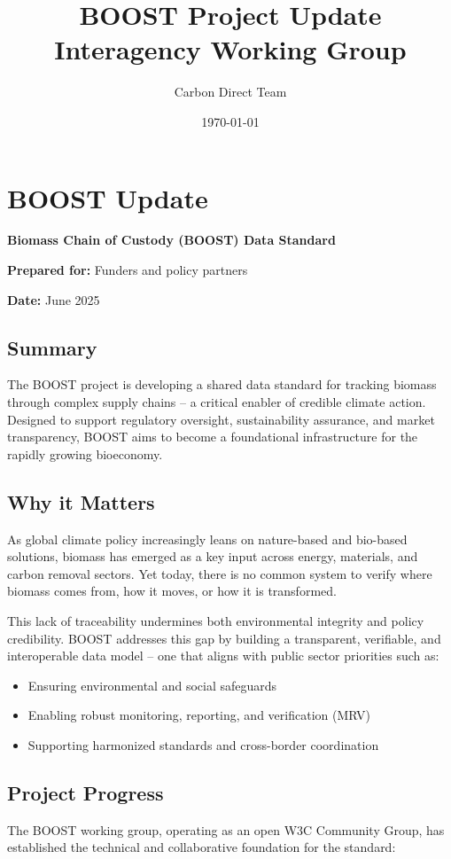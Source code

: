 \documentclass[title=small,preset=opensansnote,par=skip]{article}
\author{Carbon Direct Team}
\date{\today}
\title{BOOST Project Update\\\medskip
\large Interagency Working Group}
\begin{document}
\maketitle
\section{BOOST Update}
\label{boost-project-update}
\textbf{Biomass Chain of Custody (BOOST) Data Standard}

\textbf{Prepared for:} Funders and policy partners

\textbf{Date:} June 2025
\subsection{Summary}
\label{summary}
The BOOST project is developing a shared data standard for tracking biomass through complex supply chains -- a critical enabler of credible climate action. Designed to support regulatory oversight, sustainability assurance, and market transparency, BOOST aims to become a foundational infrastructure for the rapidly growing bioeconomy.
\subsection{Why it Matters}
\label{why-it-matters}
As global climate policy increasingly leans on nature-based and bio-based solutions, biomass has emerged as a key input across energy, materials, and carbon removal sectors. Yet today, there is no common system to verify where biomass comes from, how it moves, or how it is transformed.

This lack of traceability undermines both environmental integrity and policy credibility. BOOST addresses this gap by building a transparent, verifiable, and interoperable data model -- one that aligns with public sector priorities such as:

\begin{itemize}
\item Ensuring environmental and social safeguards

\item Enabling robust monitoring, reporting, and verification (MRV)

\item Supporting harmonized standards and cross-border coordination
\end{itemize}
\subsection{Project Progress}
\label{project-progress}
The BOOST working group, operating as an open W3C Community Group, has established the technical and collaborative foundation for the standard:
\end{document}
